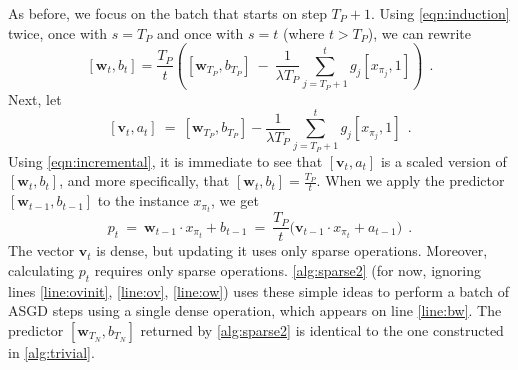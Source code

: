 \documentclass{article}
\newcommand{\bw}{\mathbf{w}}
\newcommand{\bv}{\mathbf{v}}
\newcommand{\brac}[1]{[#1]}
\begin{document}
As before, we focus on the batch that starts on step $T_P+1$.  Using
\cref{eqn:induction} twice, once with $s = T_P$ and once with $s = t$
(where $t > T_P$), we can rewrite
\begin{equation}\label{eqn:incremental}
\brac{\bw_t, b_t} =  \frac{T_P}{t} \left(  \brac{\bw_{T_P}, b_{T_P}} ~-~ \frac{1}{\lambda T_P} \sum_{j = T_P+1}^{t} g_j \brac{x_{\pi_j},1} \right)~~.
\end{equation}
Next, let 
\begin{equation}\label{eqn:def_v}
\brac{\bv_t, a_t} ~=~ \brac{\bw_{T_P}, b_{T_P}} -  \frac{1}{\lambda T_P} \sum_{j = T_P+1}^{t} g_j \brac{x_{\pi_j}, 1}~~.
\end{equation}
%
Using \cref{eqn:incremental}, it is immediate to see that
$\brac{\bv_t, a_t}$ is a scaled version of $\brac{\bw_t, b_t}$, and
more specifically, that $\brac{\bw_t, b_t} = \frac{T_P}{t}$. When we
apply the predictor $\brac{\bw_{t-1}, b_{t-1}}$ to the instance
$x_{\pi_t}$, we get
$$
  p_t ~=~ \bw_{t-1} \cdot x_{\pi_t} + b_{t-1} ~=~ \frac{T_P}{t} \big( \bv_{t-1} \cdot x_{\pi_t} + a_{t-1} \big) ~~.
$$
%
The vector $\bv_t$ is dense, but updating it uses only sparse
operations. Moreover, calculating $p_t$ requires only sparse
operations. \cref{alg:sparse2} (for now, ignoring lines
\ref{line:ovinit}, \ref{line:ov}, \ref{line:ow}) uses these simple
ideas to perform a batch of ASGD steps using a single dense operation,
which appears on line \ref{line:bw}. The predictor $\brac{\bw_{T_N},
  b_{T_N}}$ returned by \cref{alg:sparse2} is identical to the one
constructed in \cref{alg:trivial}.
\end{document}
